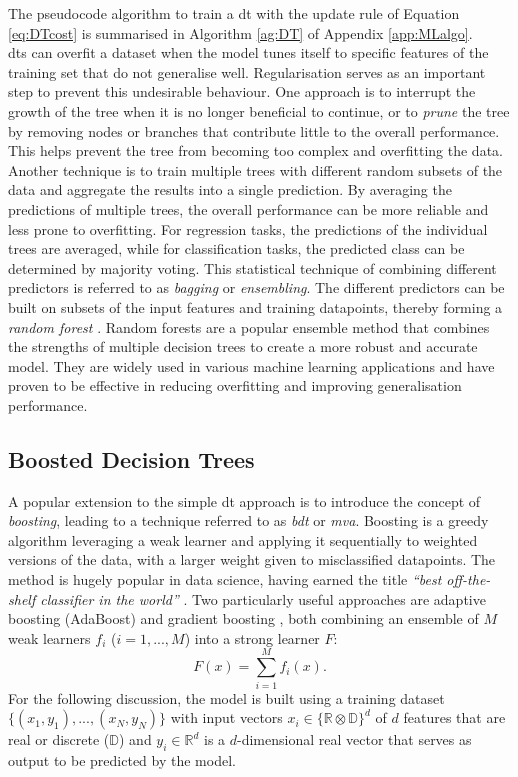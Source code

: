 The pseudocode algorithm to train a \gls{dt} with the update rule of Equation \ref{eq:DTcost} is summarised in Algorithm \ref{ag:DT} of Appendix \ref{app:MLalgo}. \\

\glspl{dt} can overfit a dataset when the model tunes itself to specific features of the training set that do not generalise well. Regularisation serves as an important step to prevent this undesirable behaviour. One approach is to interrupt the growth of the tree when it is no longer beneficial to continue, or to \textit{prune} the tree by removing nodes or branches that contribute little to the overall performance. This helps prevent the tree from becoming too complex and overfitting the data. Another technique is to train multiple trees with different random subsets of the data and aggregate the results into a single prediction. By averaging the predictions of multiple trees, the overall performance can be more reliable and less prone to overfitting. For regression tasks, the predictions of the individual trees are averaged, while for classification tasks, the predicted class can be determined by majority voting. This statistical technique of combining different predictors is referred to as \textit{bagging} or \textit{ensembling}. The different predictors can be built on subsets of the input features and training datapoints, thereby forming a \textit{random forest} \cite{russel2010}. Random forests are a popular ensemble method that combines the strengths of multiple decision trees to create a more robust and accurate model. They are widely used in various machine learning applications and have proven to be effective in reducing overfitting and improving generalisation performance.

\subsection{Boosted Decision Trees}
A popular extension to the simple \gls{dt} approach is to introduce the concept of \textit{boosting}, leading to a technique referred to as \textit{\gls{bdt}} or \textit{\gls{mva}}. Boosting is a greedy algorithm leveraging a weak learner and applying it sequentially to weighted versions of the data, with a larger weight given to misclassified datapoints. The method is hugely popular in data science, having earned the title \textit{``best off-the-shelf classifier in the world''} \cite{baggingML}. Two particularly useful approaches are adaptive boosting (AdaBoost) \cite{Adaboost} and gradient boosting \cite{gradientBoosting}, both combining an ensemble of $M$ weak learners $f_i$ ($i = 1, ..., M$) into a strong learner $F$: \[F(x) = \sum_{i=1}^M f_i(x).\] For the following discussion, the model is built using a training dataset $ \{(x_1, y_1), ..., (x_N, y_N)\}$ with input vectors $x_i \in \{\mathbb{R} \otimes \mathbb{D}\}^d$ of $d$ features that are real or discrete ($\mathbb{D}$) and $y_i \in \mathbb{R}^d$ is a $d$-dimensional real vector that serves as output to be predicted by the model.

